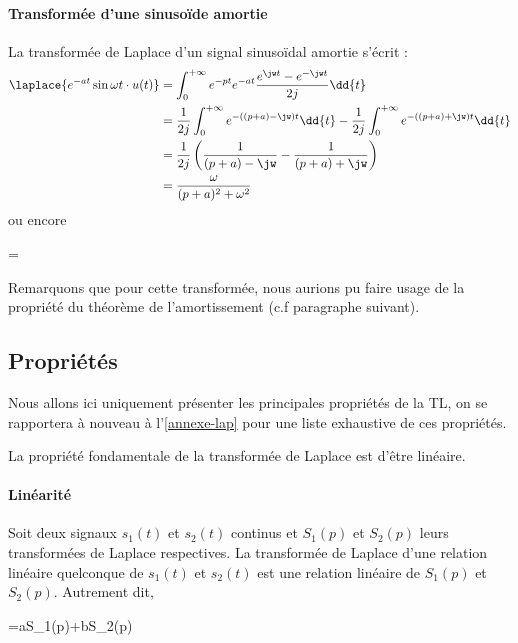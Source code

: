 \paragraph{Transformée d'une sinuso\"ide amortie}
La transformée de Laplace d'un signal sinuso\"idal amortie s'écrit :
\begin{align*}
\laplace{e^{-at}\sin{\omega t}\cdot u(t)}&=\int_{0}^{+\infty}e^{-pt}e^{-at}\dfrac{e^{\jw t}-e^{-\jw t}}{2j}\dd{t}\\
&=\dfrac{1}{2j}\int_{0}^{+\infty}e^{-((p+a)-\jw)t}\dd{t} - \dfrac{1}{2j}\int_{0}^{+\infty}e^{-((p+a)+\jw)t}\dd{t} \\
&=\dfrac{1}{2j}\left( \dfrac{1}{(p+a)-\jw}-\dfrac{1}{(p+a)+\jw}\right)\\
&=\dfrac{\omega}{(p+a)^2+\omega^2}
\end{align*}
ou encore
\begin{bequation}
    =
\end{bequation}
Remarquons que pour cette transformée, nous aurions pu faire usage
de la propriété du théorème de l'amortissement (c.f paragraphe suivant).

\subsection{Propriétés}
Nous allons ici uniquement présenter les principales propriétés de la TL, 
on se rapportera à nouveau à l'\cref{annexe-lap} pour 
une liste exhaustive de ces propriétés.

La propriété fondamentale de la transformée de Laplace est d'être linéaire.
\paragraph{Linéarité}
Soit deux signaux $s_1(t)$ et $s_2(t)$ continus et $S_1(p)$ et $S_2(p)$ leurs
transformées de Laplace respectives. La transformée de Laplace d'une 
relation linéaire quelconque de $s_1(t)$ et $s_2(t)$ est une relation linéaire 
de $S_1(p)$ et $S_2(p)$. Autrement dit,
\begin{bequation}
	=aS_1(p)+bS_2(p)
\end{bequation}

